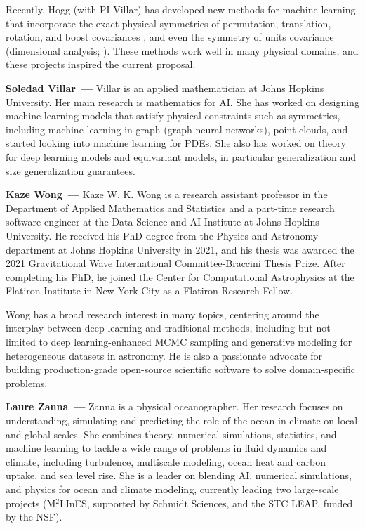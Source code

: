 \documentclass[11pt]{article}
\renewcommand{\paragraph}[1]{\medskip\par\noindent\textbf{#1~---}}
\begin{document}
Recently, Hogg (with PI Villar) has developed new methods for machine learning that incorporate the exact physical symmetries of permutation, translation, rotation, and boost covariances \cite{villar2021scalars}, and even the symmetry of units covariance (dimensional analysis; \cite{villar2023dimensionless}).
These methods work well in many physical domains, and these projects inspired the current proposal.

\paragraph{Soledad Villar} Villar is an applied mathematician at Johns Hopkins University. Her main research is mathematics for AI. She has worked on designing machine learning models that satisfy physical constraints such as symmetries, including machine learning in graph (graph neural networks), point clouds, and started looking into machine learning for PDEs. She also has worked on theory for deep learning models and equivariant models, in particular generalization and size generalization guarantees.

\paragraph{Kaze Wong} 
Kaze W. K. Wong is a research assistant professor in the Department of Applied Mathematics and Statistics and a part-time research software engineer at the Data Science and AI Institute at Johns Hopkins University. He received his PhD degree from the Physics and Astronomy department at Johns Hopkins University in 2021, and his thesis was awarded the 2021 Gravitational Wave International Committee-Braccini Thesis Prize. After completing his PhD, he joined the Center for Computational Astrophysics at the Flatiron Institute in New York City as a Flatiron Research Fellow.

Wong has a broad research interest in many topics, centering around the interplay between deep learning and traditional methods, including but not limited to deep learning-enhanced MCMC sampling and generative modeling for heterogeneous datasets in astronomy. He is also a passionate advocate for building production-grade open-source scientific software to solve domain-specific problems.

\paragraph{Laure Zanna} Zanna is a physical oceanographer. Her research focuses on understanding, simulating and predicting the role of the ocean in climate on local and global scales. She combines theory, numerical simulations, statistics, and machine learning to tackle a wide range of problems in fluid dynamics and climate, including turbulence, multiscale modeling, ocean heat and carbon uptake, and sea level rise. She is a leader on blending AI, numerical simulations, and physics for ocean and climate modeling, currently leading two large-scale projects (M$^{2}$LInES, supported by Schmidt Sciences, and the STC LEAP, funded by the NSF). 
\end{document}
